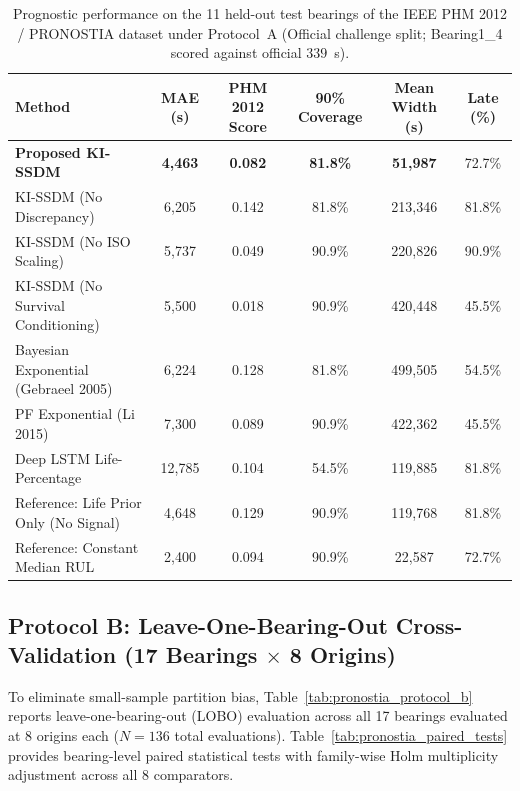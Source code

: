 \documentclass[11pt,a4paper]{article}
\begin{document}
\begin{table}[!t]
\centering
\caption{Prognostic performance on the 11 held-out test bearings of the IEEE PHM 2012 / PRONOSTIA dataset under Protocol~A (Official challenge split; Bearing1\_4 scored against official $339$~s).}
\label{tab:pronostia_protocol_a}
\small
\begin{tabular*}{\textwidth}{@{\extracolsep{\fill}}l c c c c c@{}}
\toprule
\textbf{Method} & \textbf{MAE (s)} & \textbf{PHM 2012 Score} & \textbf{90\% Coverage} & \textbf{Mean Width (s)} & \textbf{Late (\%)} \\
\midrule
\textbf{Proposed KI-SSDM} & \textbf{4,463} & \textbf{0.082} & \textbf{81.8\%} & \textbf{51,987} & 72.7\% \\
KI-SSDM (No Discrepancy) & 6,205 & 0.142 & 81.8\% & 213,346 & 81.8\% \\
KI-SSDM (No ISO Scaling) & 5,737 & 0.049 & 90.9\% & 220,826 & 90.9\% \\
KI-SSDM (No Survival Conditioning) & 5,500 & 0.018 & 90.9\% & 420,448 & 45.5\% \\
\midrule
Bayesian Exponential (Gebraeel 2005) & 6,224 & 0.128 & 81.8\% & 499,505 & 54.5\% \\
PF Exponential (Li 2015) & 7,300 & 0.089 & 90.9\% & 422,362 & 45.5\% \\
Deep LSTM Life-Percentage & 12,785 & 0.104 & 54.5\% & 119,885 & 81.8\% \\
\midrule
Reference: Life Prior Only (No Signal) & 4,648 & 0.129 & 90.9\% & 119,768 & 81.8\% \\
Reference: Constant Median RUL & 2,400 & 0.094 & 90.9\% & 22,587 & 72.7\% \\
\bottomrule
\end{tabular*}
\end{table}

\subsection{Protocol B: Leave-One-Bearing-Out Cross-Validation (17 Bearings $\times$ 8 Origins)}
To eliminate small-sample partition bias, Table~\ref{tab:pronostia_protocol_b} reports leave-one-bearing-out (LOBO) evaluation across all 17 bearings evaluated at 8 origins each ($N=136$ total evaluations). Table~\ref{tab:pronostia_paired_tests} provides bearing-level paired statistical tests with family-wise Holm multiplicity adjustment across all 8 comparators.
\end{document}

